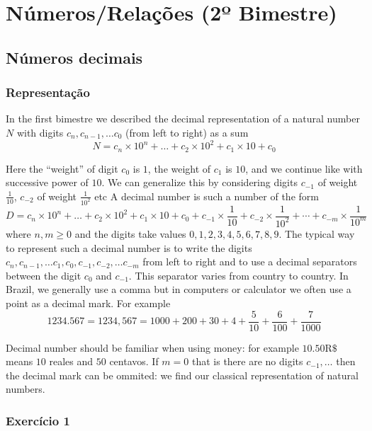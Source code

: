 \chapter{Números/Relações (2º Bimestre)}

\section{Números decimais}

\subsection*{Representação}

In the first bimestre we described the decimal representation of a natural
number $N$ with digits $c_n,c_{n-1}, \ldots c_0$ (from left to right) as a sum
$$N = {c_n \times 10^n} + \dots + {c_2 \times 10^2} + c_1 \times 10 + c_0$$

Here the ``weight'' of digit $c_0$ is $1$, the weight of $c_1$ is $10$,
and we continue like with successive power of $10$. We can generalize this
by considering digits $c_{-1}$ of weight $\frac{1}{10}$, $c_{-2}$ of weight
$\frac{1}{10^2}$ etc A decimal number is such a number of the form
$$D = {c_n \times 10^n} + \dots + {c_2 \times 10^2} + c_1 \times 10 + c_0 +
{c_{-1} \times \frac{1}{10}} +
{c_{-2} \times \frac{1}{10^2}} + \cdots +
{c_{-m} \times \frac{1}{10^{m}}}
$$
where $n,m \geq 0$ and the digits take values $0,1,2,3,4,5,6,7,8,9$. The
typical way to represent such a decimal number is to write the digits
$c_n,c_{n-1},\dots c_{1}, c_{0}, c_{-1}, c_{-2}, \dots c_{-m}$ from left to right
and to use a decimal separators between the digit $c_0$ and $c_{-1}$. This
separator varies from country to country.
In Brazil, we generally use a comma but
in computers or calculator we often use a point as a decimal mark. For example
$${1234.567} = {1234,567} = 1000 + 200 + 30 + 4 + \frac{5}{10} + \frac{6}{100} +
\frac{7}{1000}$$

Decimal number should be familiar when using money: for example
$10.50 \text{R\$}$ means $10$ reales and $50$ centavos.
If $m=0$ that is there are no digits $c_{-1}, \dots$ then the decimal mark can
be ommited: we find our classical representation of natural numbers.

\subsection*{Exercício 1}

